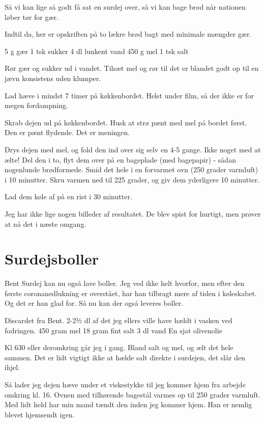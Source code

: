 \documentclass[
]{book}
\begin{document}
Så vi kan lige så godt få sat en surdej over, så vi kan bage brød når nationen løber tør for gær.

Indtil da, her er opskriften på to lækre brød bagt med minimale mængder gær.

5 g gær
1 tsk sukker
4 dl lunkent vand
450 g mel
1 tsk salt

Rør gær og sukker ud i vandet. Tilsæt mel og rør til det er blandet godt op til en jævn konsistens uden klumper.

Lad hæve i mindst 7 timer på køkkenbordet. Helst under film, så der ikke er for megen fordampning.

Skrab dejen ud på køkkenbordet. Husk at strø pænt med mel på bordet først. Den er pænt flydende. Det er meningen.

Drys dejen med mel, og fold den ind over sig selv en 4-5 gange. Ikke noget med at ælte! Del den i to, flyt dem over på en bageplade (med bagepapir) - sådan nogenlunde brødformede. Smid det hele i en forvarmet ovn (250 grader varmluft) i 10 minutter. Skru varmen ned til 225 grader, og giv dem yderligere 10 minutter.

Lad dem køle af på en rist i 30 minutter.

Jeg har ikke lige nogen billeder af resultatet. De blev spist for hurtigt, men prøver at nå det i næste omgang.

\hypertarget{surdejsboller}{%
\section{Surdejsboller}\label{surdejsboller}}

Bent Surdej kan nu også lave boller. Jeg ved ikke helt hvorfor, men efter den første coronanedlukning er overstået, har han tilbragt mere af tiden i køleskabet. Og det er han glad for. Så nu kan der også leveres boller.

Discardet fra Bent. 2-2½ dl af det jeg ellers ville have hældt i vasken ved fodringen.
450 gram mel
18 gram fint salt
3 dl vand
En sjat olivenolie

Kl 630 eller deromkring går jeg i gang. Bland salt og mel, og ælt det hele sammen. Det er lidt vigtigt ikke at hælde salt direkte i surdejen, det slår den ihjel.

Så lader jeg dejen hæve under et viskestykke til jeg kommer hjem fra arbejde omkring kl. 16. Ovnen med tilhørende bagestål varmes op til 250 grader varmluft. Med lidt held har min mand tændt den inden jeg kommer hjem. Han er nemlig blevet hjemsendt igen.
\end{document}
